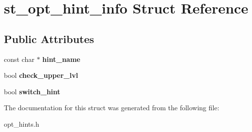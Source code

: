 \hypertarget{structst__opt__hint__info}{}\section{st\+\_\+opt\+\_\+hint\+\_\+info Struct Reference}
\label{structst__opt__hint__info}
\subsection*{Public Attributes}
\begin{DoxyCompactItemize}
\item 
\mbox{\label{structst__opt__hint__info_af98f140a3e61d3b2ee15a3db7df86366}} 
const char $\ast$ {\bfseries hint\+\_\+name}
\item 
\mbox{\label{structst__opt__hint__info_ad4547abf90ed163e5be32ed360c05492}} 
bool {\bfseries check\+\_\+upper\+\_\+lvl}
\item 
\mbox{\label{structst__opt__hint__info_a3468b0ca8be8491a8f78b474982a0e24}} 
bool {\bfseries switch\+\_\+hint}
\end{DoxyCompactItemize}


The documentation for this struct was generated from the following file\+:\begin{DoxyCompactItemize}
\item 
opt\+\_\+hints.\+h\end{DoxyCompactItemize}
